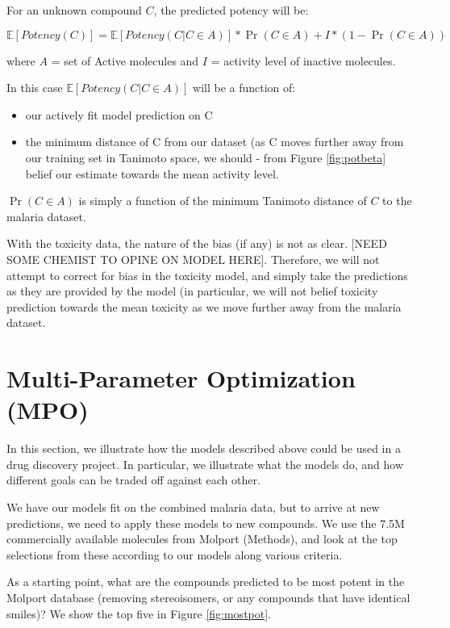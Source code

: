 \documentclass{article}
\begin{document}
For an unknown compound $C$, the predicted potency will be:

\begin{equation}
    \mathbb{E}[Potency(C)] = \mathbb{E}[Potency(C | C \in A)] * \Pr(C \in A) + I * (1-\Pr(C \in A))   
\end{equation}

where $A$ = set of Active molecules and $I$ = activity level of inactive molecules.

In this case $\mathbb{E}[Potency(C | C \in A)]$ will be a function of: \begin{itemize}
    \item our actively fit model prediction on C
    \item the minimum distance of C from our dataset (as C moves further away from our training set in Tanimoto space, we should - from Figure \ref{fig:potbeta} belief our estimate towards the mean activity level.
\end{itemize}

$\Pr(C \in A)$ is simply a function of the minimum Tanimoto distance of $C$ to the malaria dataset.


With the toxicity data, the nature of the bias (if any) is not as clear. [NEED SOME CHEMIST TO OPINE ON MODEL HERE].  Therefore, we will not attempt to correct for bias in the toxicity model, and simply take the predictions as they are provided by the model (in particular, we will not belief toxicity prediction towards the mean toxicity as we move further away from the malaria dataset.


\section{Multi-Parameter Optimization (MPO)}

In this section, we illustrate how the models described above could be used in a drug discovery project. In particular, we illustrate what the models do, and how different goals can be traded off against each other.

We have our models fit on the combined malaria data, but to arrive at new predictions, we need to apply these models to new compounds.  We use the 7.5M commercially available molecules from Molport (Methods), and look at the top selections from these according to our models along various criteria.

As a starting point, what are the compounds predicted to be most potent in the Molport database (removing stereoisomers, or any compounds that have identical 
smiles)?  We show the top five in Figure \ref{fig:mostpot}.
\end{document}
